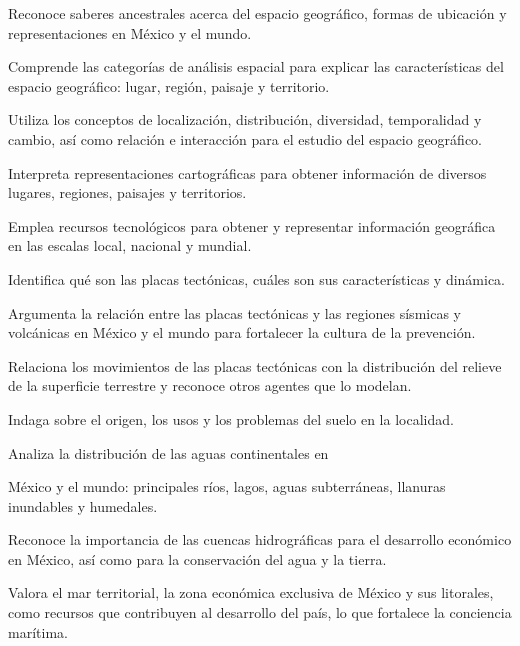 \item Reconoce saberes ancestrales acerca del espacio geográfico, formas de ubicación y representaciones en México y el mundo.
\item Comprende las categorías de análisis espacial para explicar las características del espacio geográfico: lugar, región, paisaje y territorio.
\item Utiliza los conceptos de localización, distribución, diversidad, temporalidad y cambio, así como relación e interacción para el estudio del espacio geográfico.
\item Interpreta representaciones cartográficas para obtener información de diversos lugares, regiones, paisajes y territorios.
\item Emplea recursos tecnológicos para obtener y representar información geográfica en las escalas local, nacional y mundial.
\item Identifica qué son las placas tectónicas, cuáles son sus características y dinámica.
\item Argumenta la relación entre las placas tectónicas y las regiones sísmicas y volcánicas en México y el mundo para fortalecer la cultura de la prevención.
\item Relaciona los movimientos de las placas tectónicas con la distribución del relieve de la superficie terrestre y reconoce otros agentes que lo modelan.
\item Indaga sobre el origen, los usos y los problemas del suelo en la localidad.
\item Analiza la distribución de las aguas continentales en
\item México y el mundo: principales ríos, lagos, aguas subterráneas, llanuras inundables y humedales.
\item Reconoce la importancia de las cuencas hidrográficas para el desarrollo económico en México, así como para la conservación del agua y la tierra.
\item Valora el mar territorial, la zona económica exclusiva de México y sus litorales, como recursos que contribuyen al desarrollo del país, lo que fortalece la conciencia marítima.
